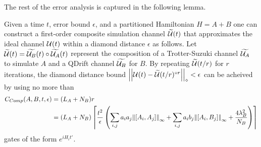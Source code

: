 The rest of the error analysis is captured in the following lemma.
\begin{theorem} \label{thm:first_order_composite}
Given a time $t$, error bound $\epsilon$, and a partitioned Hamiltonian $H = A + B$ one can construct a first-order composite simulation channel $\widetilde{\mathcal{U}}(t)$ that approximates the ideal channel $\mathcal{U}(t)$ within a diamond distance $\epsilon$ as follows. Let $\widetilde{\mathcal{U}}(t) = \widetilde{\mathcal{U}_B}(t) \circ \widetilde{\mathcal{U}_A}(t)$ represent the composition of a Trotter-Suzuki channel $\widetilde{\mathcal{U}_A}$ to simulate $A$ and a QDrift channel $\widetilde{\mathcal{U}_B}$ for $B$. By repeating $\widetilde{\mathcal{U}}(t/r)$ for $r$ iterations, the diamond distance bound $\left| \left| \mathcal{U}(t) - \widetilde{\mathcal{U}}(t/r)^{\circ r} \right| \right|_\diamond < \epsilon$ can be acheived by using no more than 
\begin{align}
    C_{Comp}(A, B, t, \epsilon) &= (L_A + N_B) r \\
    &= (L_A + N_B) \left\lceil \frac{t^2}{\epsilon} \left( \sum_{i,j} a_i a_j \norm{[A_i, A_j]}_{\infty} +  \sum_{i,j} a_i b_j\norm{ [A_i, B_j]}_{\infty} + \frac{4 \lambda_B^2}{N_B} \right) \right\rceil \label{eq:first_order_comp_cost}
\end{align} 
gates of the form $e^{i H_i t'}$. 

\end{theorem}
